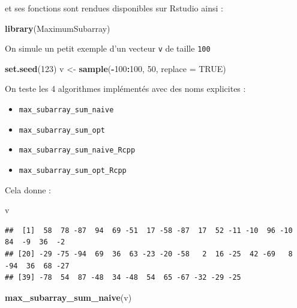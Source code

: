 \documentclass[
]{article}
\newenvironment{Shaded}{\begin{snugshade}}{\end{snugshade}}
\newcommand{\AttributeTok}[1]{\textcolor[rgb]{0.13,0.29,0.53}{#1}}
\newcommand{\ConstantTok}[1]{\textcolor[rgb]{0.56,0.35,0.01}{#1}}
\newcommand{\DecValTok}[1]{\textcolor[rgb]{0.00,0.00,0.81}{#1}}
\newcommand{\FunctionTok}[1]{\textcolor[rgb]{0.13,0.29,0.53}{\textbf{#1}}}
\newcommand{\NormalTok}[1]{#1}
\newcommand{\OtherTok}[1]{\textcolor[rgb]{0.56,0.35,0.01}{#1}}
\newcommand{\SpecialCharTok}[1]{\textcolor[rgb]{0.81,0.36,0.00}{\textbf{#1}}}
\providecommand{\tightlist}{%
  \setlength{\itemsep}{0pt}\setlength{\parskip}{0pt}}
\begin{document}
et ses fonctions sont rendues disponibles sur Rstudio ainsi :

\begin{Shaded}
\begin{Highlighting}[]
\FunctionTok{library}\NormalTok{(MaximumSubarray)}
\end{Highlighting}
\end{Shaded}

On simule un petit exemple d'un vecteur \texttt{v} de taille
\texttt{100}

\begin{Shaded}
\begin{Highlighting}[]
\FunctionTok{set.seed}\NormalTok{(}\DecValTok{123}\NormalTok{)}
\NormalTok{v }\OtherTok{\textless{}{-}} \FunctionTok{sample}\NormalTok{(}\SpecialCharTok{{-}}\DecValTok{100}\SpecialCharTok{:}\DecValTok{100}\NormalTok{, }\DecValTok{50}\NormalTok{, }\AttributeTok{replace =} \ConstantTok{TRUE}\NormalTok{)}
\end{Highlighting}
\end{Shaded}

On teste les 4 algorithmes implémentés avec des noms explicites :

\begin{itemize}
\tightlist
\item
  \texttt{max\_subarray\_sum\_naive}
\item
  \texttt{max\_subarray\_sum\_opt}
\item
  \texttt{max\_subarray\_sum\_naive\_Rcpp}
\item
  \texttt{max\_subarray\_sum\_opt\_Rcpp}
\end{itemize}

Cela donne :

\begin{Shaded}
\begin{Highlighting}[]
\NormalTok{v}
\end{Highlighting}
\end{Shaded}

\begin{verbatim}
##  [1]  58  78 -87  94  69 -51  17 -58 -87  17  52 -11 -10  96 -10  84  -9  36  -2
## [20] -29 -75 -94  69  36  63 -23 -20 -58   2  16 -25  42 -69   8 -94  36  68 -27
## [39] -78  54  87 -48  34 -48  54  65 -67 -32 -29 -25
\end{verbatim}

\begin{Shaded}
\begin{Highlighting}[]
\FunctionTok{max\_subarray\_sum\_naive}\NormalTok{(v)}
\end{Highlighting}
\end{Shaded}
\end{document}
